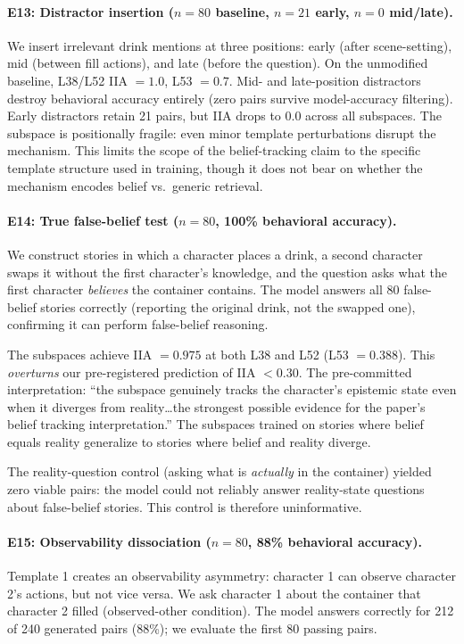 \documentclass[11pt]{article}
\begin{document}
\paragraph{E13: Distractor insertion ($n = 80$ baseline, $n = 21$ early, $n = 0$ mid/late).}
We insert irrelevant drink mentions at three positions: early (after scene-setting), mid (between fill actions), and late (before the question). On the unmodified baseline, L38/L52 IIA $= 1.0$, L53 $= 0.7$. Mid- and late-position distractors destroy behavioral accuracy entirely (zero pairs survive model-accuracy filtering). Early distractors retain 21 pairs, but IIA drops to $0.0$ across all subspaces. The subspace is positionally fragile: even minor template perturbations disrupt the mechanism. This limits the scope of the belief-tracking claim to the specific template structure used in training, though it does not bear on whether the mechanism encodes belief vs.\ generic retrieval.

\paragraph{E14: True false-belief test ($n = 80$, 100\% behavioral accuracy).}
We construct stories in which a character places a drink, a second character swaps it without the first character's knowledge, and the question asks what the first character \emph{believes} the container contains. The model answers all 80 false-belief stories correctly (reporting the original drink, not the swapped one), confirming it can perform false-belief reasoning.

The subspaces achieve IIA $= 0.975$ at both L38 and L52 (L53 $= 0.388$). This \emph{overturns} our pre-registered prediction of IIA $< 0.30$. The pre-committed interpretation: ``the subspace genuinely tracks the character's epistemic state even when it diverges from reality\ldots the strongest possible evidence for the paper's belief tracking interpretation.'' The subspaces trained on stories where belief equals reality generalize to stories where belief and reality diverge.

The reality-question control (asking what is \emph{actually} in the container) yielded zero viable pairs: the model could not reliably answer reality-state questions about false-belief stories. This control is therefore uninformative.

\paragraph{E15: Observability dissociation ($n = 80$, 88\% behavioral accuracy).}
Template 1 creates an observability asymmetry: character 1 can observe character 2's actions, but not vice versa. We ask character 1 about the container that character 2 filled (observed-other condition). The model answers correctly for 212 of 240 generated pairs (88\%); we evaluate the first 80 passing pairs.
\end{document}
